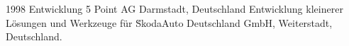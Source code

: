 \cventry
{1998}
{Entwicklung}
{}
{5 Point AG}
{Darmstadt, Deutschland}
{
  Entwicklung kleinerer Lösungen und Werkzeuge für \u SkodaAuto Deutschland GmbH,
  Weiterstadt, Deutschland.
}
